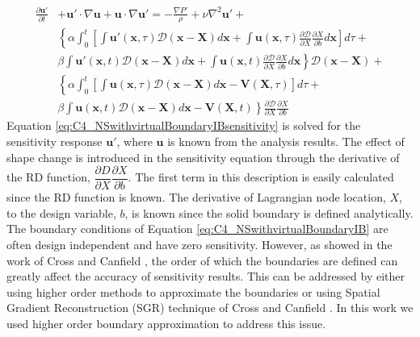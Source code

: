\begin{align}\label{eq:C4_NSwithvirtualBoundaryIBsensitivity}
    \frac{\partial \mathbf{u}'}{\partial t} &+ 
    \mathbf{u}' \cdot \nabla \mathbf{u} +
    \mathbf{u} \cdot \nabla \mathbf{u}' = 
    -\frac{\nabla P'}{\rho} + 
    \nu \nabla^2 \mathbf{u}' + \nonumber \\
    &\left\{
    \alpha
    \int_0^t
    \left[
        \int \mathbf{u}'(\mathbf{x}, \tau) \mathcal{D}(\mathbf{x} - \mathbf{X}) d\mathbf{x} + 
        \int \mathbf{u}(\mathbf{x}, \tau) \frac{\partial \mathcal{D}}{\partial X} \frac{\partial X}{\partial b} d\mathbf{x}
    \right] d\tau \right.
    + \nonumber \\
    &
    \left.
    \beta
    \int \mathbf{u}'(\mathbf{x}, t) \mathcal{D}(\mathbf{x} - \mathbf{X}) d\mathbf{x} +
    \int \mathbf{u}(\mathbf{x}, t) \frac{\partial \mathcal{D}}{\partial X} \frac{\partial X}{\partial b} d\mathbf{x}
    \right\} \mathcal{D}(\mathbf{x} - \mathbf{X}) + \nonumber \\
    &\left\{
    \alpha
    \int_0^t
    \left[
        \int \mathbf{u}(\mathbf{x}, \tau) \mathcal{D}(\mathbf{x} - \mathbf{X}) d\mathbf{x} - \mathbf{V}(\mathbf{X}, \tau)
    \right] d\tau \right.
    + \nonumber \\
    &
    \left.
    \beta
    \int \mathbf{u}(\mathbf{x}, t) \mathcal{D}(\mathbf{x} - \mathbf{X}) d\mathbf{x} - \mathbf{V}(\mathbf{X}, t)
    \right\}
    \frac{\partial \mathcal{D}}{\partial X} \frac{\partial X}{\partial b}
\end{align}
%
Equation \eqref{eq:C4_NSwithvirtualBoundaryIBsensitivity} is solved for the sensitivity response $\mathbf{u}'$, where $\mathbf{u}$ is known from the analysis results. The effect of shape change is introduced in the sensitivity equation through the derivative of the RD function, $\dfrac{\partial D}{\partial X} \dfrac{\partial X}{\partial b}$. The first term in this description is easily calculated since the RD function is known. The derivative of Lagrangian node location, $X$, to the design variable, $b$, is known since the solid boundary is defined analytically. The boundary conditions of Equation \eqref{eq:C4_NSwithvirtualBoundaryIB} are often design independent and have zero sensitivity. However, as showed in the work of Cross and Canfield \cite{cross2015local}, the order of which the boundaries are defined can greatly affect the accuracy of sensitivity results. This can be addressed by either using higher order methods to approximate the boundaries or using Spatial Gradient Reconstruction (SGR) technique of Cross and Canfield \cite{cross2014local}. In this work we used higher order boundary approximation to address this issue.

